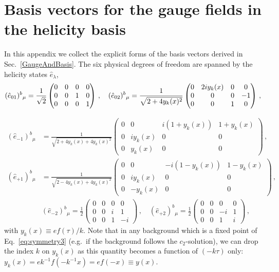 \section{Basis vectors for the gauge fields in the helicity basis \label{app:basis} }


In this appendix we collect the explicit forms of the basis vectors derived in Sec.~\ref{GaugeAndBasis}. The six physical degrees of freedom are spanned by the helicity states $\hat e_\lambda$,
\begin{equation*}
 (\hat e_{01})^{b}{}_{\mu} = \frac{1}{\sqrt{2}}
 \begin{pmatrix}
 0 & 0 & 0 & 0 \\ 0 & 0 & 1 & 0 \\  0 &0 & 0 & 1
 \end{pmatrix}  \,,  \quad 
 (\hat e_{02})^{b}{}_{\mu} = \frac{1}{\sqrt{2 + 4 y_k(x)^2}}
 \begin{pmatrix}
  0 & 2 i y_k(x) & 0 & 0 \\  0 & 0 & 0 & -1 \\ 0 & 0 & 1 & 0 
 \end{pmatrix} \,,\nonumber \\
 \end{equation*}
 
 \begin{align}
 (\hat  e_{-1})^{b}{}_{\mu} & = \frac{1}{\sqrt{2 + 4 y_k(x) + 4 y_k(x)^2}}
 \begin{pmatrix}
  0 & 0 & i(1 + y_k(x)) & 1 + y_k(x) \\ 0 &  i y_k(x) & 0 & 0 \\ 0 &  y_k(x) & 0 & 0 
 \end{pmatrix} \,,
   \nonumber \\
 (\hat e_{+1})^{b}{}_{\mu} &= \frac{1}{\sqrt{2 - 4 y_k(x) + 4 y_k(x)^2}}
 \begin{pmatrix}
0 &   0 & -i(1 - y_k(x))  & 1 - y_k(x) \\ 0 & i y_k(x) & 0 & 0 \\ 0 & - y_k(x) & 0 & 0
 \end{pmatrix} \,, 
 \nonumber \\
 &(\hat e_{-2})^{b}{}_{\mu} = \frac{1}{2}
 \begin{pmatrix}
   0 & 0 & 0 & 0 \\ 0 &  0 & i & 1 \\ 0 & 0 & 1 & -i 
 \end{pmatrix} \,,
 \quad
 (\hat e_{+2})^{b}{}_{\mu} = \frac{1}{2}\begin{pmatrix}
  0 & 0 & 0 & 0 \\ 0 & 0 & -i & 1 \\ 0 & 0 & 1 & i 
 \end{pmatrix}  \,,
 \label{eq:basis}
\end{align}
with $y_k(x) \equiv e f(\tau)/k$. Note that in any background which is a fixed point of Eq.~\eqref{eq:symmetry3} (e.g.\ if the background follows the $c_2$-solution), we can drop the index $k$ on $y_k(x)$ as this quantity becomes a function of $(- k \tau)$ only: $y_k(x) = e k^{-1} f(- k^{-1} x) = e f(-x) \equiv y(x)$.

